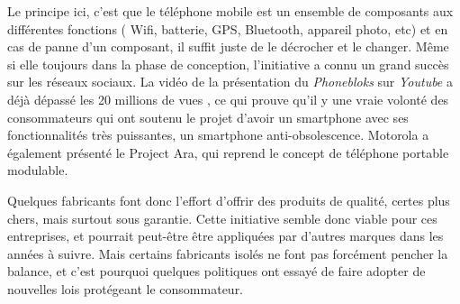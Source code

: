 \bigbreak
Le principe ici, c'est que le téléphone mobile est un ensemble de composants aux différentes fonctions ( Wifi, batterie, GPS, Bluetooth, appareil photo, etc) et en cas de panne d'un composant, il suffit juste de le décrocher et le changer. 
Même si elle toujours dans la phase de conception, l'initiative a connu un grand succès sur les réseaux sociaux. La vidéo de la présentation du \textit{Phonebloks} sur \textit{Youtube} a déjà dépassé les 20 millions de vues \cite{pb_yt}, ce qui prouve qu'il y une vraie volonté des consommateurs qui ont soutenu le projet d'avoir un smartphone avec ses fonctionnalités très puissantes, un smartphone anti-obsolescence. Motorola a également présenté le Project Ara, qui reprend le concept de téléphone portable modulable.

\bigbreak
Quelques fabricants font donc l'effort d'offrir des produits de qualité, certes plus chers, mais surtout sous garantie. Cette initiative semble donc viable pour ces entreprises, et pourrait peut-être être appliquées par d'autres marques dans les années à suivre. Mais certains fabricants isolés ne font pas forcément pencher la balance, et c'est pourquoi quelques politiques ont essayé de faire adopter de nouvelles lois protégeant le consommateur.









